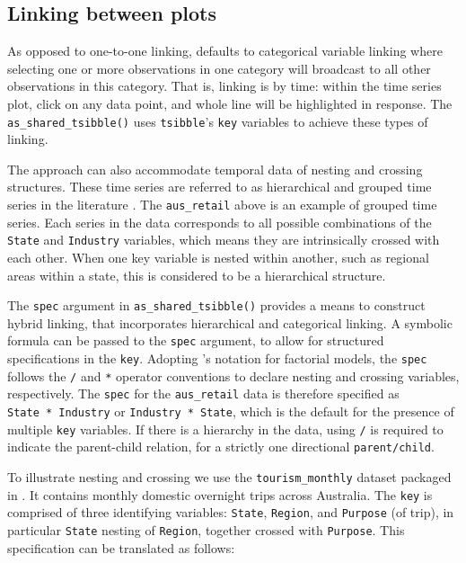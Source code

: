 \hypertarget{linking-between-plots}{%
\subsection{Linking between plots}\label{linking-between-plots}}

As opposed to one-to-one linking,  defaults to
categorical variable linking where selecting one or more observations in
one category will broadcast to all other observations in this category.
That is, linking is by time: within the time series plot, click on any
data point, and whole line will be highlighted in response. The
\texttt{as\_shared\_tsibble()} uses \texttt{tsibble}'s \texttt{key}
variables to achieve these types of linking.

The approach can also accommodate temporal data of nesting and crossing
structures. These time series are referred to as hierarchical and
grouped time series in the literature \citep{fpp}. The
\texttt{aus\_retail} above is an example of grouped time series. Each
series in the data corresponds to all possible combinations of the
\texttt{State} and \texttt{Industry} variables, which means they are
intrinsically crossed with each other. When one key variable is nested
within another, such as regional areas within a state, this is
considered to be a hierarchical structure.

The \texttt{spec} argument in \texttt{as\_shared\_tsibble()} provides a
means to construct hybrid linking, that incorporates hierarchical and
categorical linking. A symbolic formula can be passed to the
\texttt{spec} argument, to allow for structured specifications in the
\texttt{key}. Adopting \citet{Wilkinson1973}'s notation for factorial
models, the \texttt{spec} follows the \texttt{/} and \texttt{*} operator
conventions to declare nesting and crossing variables, respectively. The
\texttt{spec} for the \texttt{aus\_retail} data is therefore specified
as \texttt{State\ *\ Industry} or \texttt{Industry\ *\ State}, which is
the default for the presence of multiple \texttt{key} variables. If
there is a hierarchy in the data, using \texttt{/} is required to
indicate the parent-child relation, for a strictly one directional
\texttt{parent/child}.

To illustrate nesting and crossing we use the \texttt{tourism\_monthly}
dataset \citep{tourism} packaged in . It contains
monthly domestic overnight trips across Australia. The \texttt{key} is
comprised of three identifying variables: \texttt{State},
\texttt{Region}, and \texttt{Purpose} (of trip), in particular
\texttt{State} nesting of \texttt{Region}, together crossed with
\texttt{Purpose}. This specification can be translated as follows:

